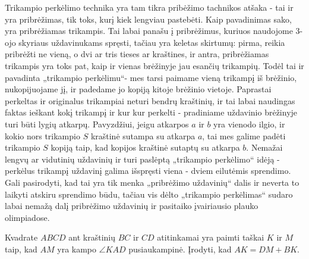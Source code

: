 Trikampio perkėlimo technika yra tam tikra pribėžimo
tachnikos atšaka - tai ir yra pribrėžimas, tik toks, kurį
kiek lengviau pastebėti. Kaip pavadinimas sako, yra
pribrėžiamas trikampis. Tai labai panašu į pribrėžimus,
kuriuos naudojome 3-ojo skyriaus uždavinukams spręsti,
tačiau yra keletas skirtumų: pirma, reikia pribrėžti ne
vieną, o dvi ar tris tieses ar kraštines, ir antra,
pribrėžiamas trikampis yra toks pat, kaip ir vienas
brėžinyje jau esančių trikampių. Todėl tai ir pavadinta
„trikampio perkėlimu“- mes tarsi paimame vieną trikampį iš
brėžinio, nukopijuojame jį, ir padedame jo kopiją kitoje
brėžinio vietoje. Paprastai perkeltas ir originalus
trikampiai neturi bendrų kraštinių, ir tai labai naudingas
faktas ieškant kokį trikampį ir kur kur perkelti -
pradiniame uždavinio brėžinyje turi būti lygių atkarpų.
Pavyzdžiui, jeigu atkarpos $a$ ir $b$ yra vienodo ilgio, ir
kokio nors trikampio $S$ kraštinė sutampa su atkarpa $a$,
tai mes galime padėti trikampio $S$ kopiją taip, kad kopijos
kraštinė sutaptų su atkarpa $b$. Nemažai lengvų ar vidutinių
uždavinių ir turi paslėptą „trikampio perkėlimo“ idėją -
perkėlus trikampį uždavinį galima išspręsti viena - dviem
eilutėmis sprendimo. Gali pasirodyti, kad tai yra tik menka
„pribrėžimo uždavinių“ dalis ir neverta to laikyti atskiru
sprendimo būdu, tačiau vis dėlto „trikampio perkėlimas“
sudaro labai nemažą dalį pribrėžimo uždavinių ir pasitaiko
įvairiausio plauko olimpiadose.

\begin{pav}
  Kvadrate $ABCD$ ant kraštinių $BC$ ir $CD$ atitinkamai yra
  paimti taškai $K$ ir $M$ taip, kad $AM$ yra kampo $\angle
  KAD$ pusiaukampinė. Įrodyti, kad $AK = DM + BK$.
\end{pav}       


